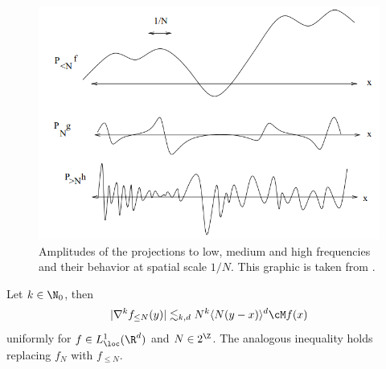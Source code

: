 \begin{figure}[h]
	\begin{center}
		\includegraphics[scale =0.5]{uncertainty}
		\caption{Amplitudes of the projections to low, medium and high frequencies and their behavior at spatial scale $1/N$. This graphic is taken from \cite[Appendix A]{Tao2006}.}
	\end{center}
\end{figure}




\begin{proposition}
	Let $k \in \N_0$, then 	
		\[ |\nabla^k f_{\leq N} (y)| \lesssim_{k, d} N^k \langle N(y - x) \rangle^d \cM f (x) \]
	uniformly for $f \in L^1_{\loc} (\R^d)$ and $N \in 2^\Z$. The analogous inequality holds replacing $f_N$ with $f_{\leq N}$. 
\end{proposition}

